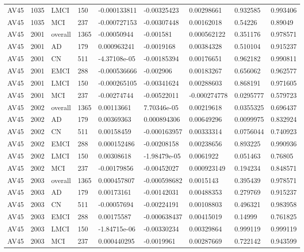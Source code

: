 \begin{landscape}
\begin{longtable}{lllllllll}
AV45 & 1035 & LMCI & 150 & -0.000133811 & -0.00325423 & 0.00298661 & 0.932585 & 0.993406 \\
AV45 & 1035 & MCI & 237 & -0.000727153 & -0.00307448 & 0.00162018 & 0.54226 & 0.89049 \\
AV45 & 2001 & overall & 1365 & -0.00050944 & -0.001581 & 0.000562122 & 0.351176 & 0.978571 \\
AV45 & 2001 & AD & 179 & 0.000963241 & -0.0019168 & 0.00384328 & 0.510104 & 0.915237 \\
AV45 & 2001 & CN & 511 & -4.37108e-05 & -0.00185394 & 0.00176651 & 0.962182 & 0.990811 \\
AV45 & 2001 & EMCI & 288 & -0.000536666 & -0.002906 & 0.00183267 & 0.656062 & 0.962577 \\
AV45 & 2001 & LMCI & 150 & -0.000265105 & -0.00341624 & 0.00288603 & 0.868191 & 0.971605 \\
AV45 & 2001 & MCI & 237 & -0.00274744 & -0.00522011 & -0.000274778 & 0.0295777 & 0.579723 \\
AV45 & 2002 & overall & 1365 & 0.00113661 & 7.70346e-05 & 0.00219618 & 0.0355325 & 0.696437 \\
AV45 & 2002 & AD & 179 & 0.00369363 & 0.000894306 & 0.00649296 & 0.0099975 & 0.832924 \\
AV45 & 2002 & CN & 511 & 0.00158459 & -0.000163957 & 0.00333314 & 0.0756044 & 0.740923 \\
AV45 & 2002 & EMCI & 288 & 0.000152486 & -0.00208158 & 0.00238656 & 0.893225 & 0.990936 \\
AV45 & 2002 & LMCI & 150 & 0.00308618 & -1.98479e-05 & 0.0061922 & 0.051463 & 0.76805 \\
AV45 & 2002 & MCI & 237 & -0.00179856 & -0.00452027 & 0.000923149 & 0.194234 & 0.848571 \\
AV45 & 2003 & overall & 1365 & 0.000457807 & -0.000598682 & 0.0015143 & 0.395439 & 0.978571 \\
AV45 & 2003 & AD & 179 & 0.00173161 & -0.00142031 & 0.00488353 & 0.279769 & 0.915237 \\
AV45 & 2003 & CN & 511 & -0.00057694 & -0.00224191 & 0.00108803 & 0.496321 & 0.983958 \\
AV45 & 2003 & EMCI & 288 & 0.00175587 & -0.000638437 & 0.00415019 & 0.14999 & 0.761825 \\
AV45 & 2003 & LMCI & 150 & -1.84715e-06 & -0.00330234 & 0.00329864 & 0.999119 & 0.999119 \\
AV45 & 2003 & MCI & 237 & 0.000440295 & -0.0019961 & 0.00287669 & 0.722142 & 0.943599 \\

\end{longtable}
\end{landscape}
